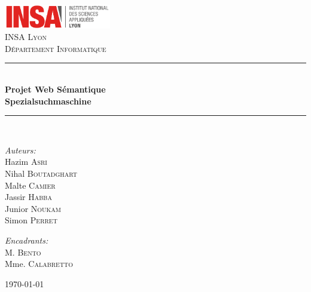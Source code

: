 \documentclass[a4paper]{article}
\begin{document}
\newcommand{\HRule}{\rule{\linewidth}{0.5mm}}


\begin{center}
\includegraphics[width=0.35\textwidth]{./logo}~\\[2cm]
\vspace{3cm}
\textsc{\LARGE INSA Lyon}\\[0.5cm]
\textsc{\Large Département Informatique}\\[0.5cm]
\HRule \\[0.4cm]
{\huge \bfseries Projet Web Sémantique\\
Spezialsuchmaschine\\[0.4cm] }
\HRule \\[1.5cm]
\begin{minipage}{0.4\textwidth}
\begin{flushleft} \large
\emph{Auteurs:} \\
Hazim \textsc{Asri}\\
Nihal \textsc{Boutadghart}\\
Malte \textsc{Camier}\\
Jassir \textsc{Habba}\\
Junior \textsc{Noukam}\\
Simon \textsc{Perret}\\
\end{flushleft}
\end{minipage}
\begin{minipage}{0.4\textwidth}
\begin{flushright} \large
\emph{Encadrants:} \\
M. \textsc{Bento}\\
Mme. \textsc{Calabretto}\\
\end{flushright}
\end{minipage}
\vfill
{\large \today}
\end{center}

\newpage
\tableofcontents
\newpage

\end{document}
